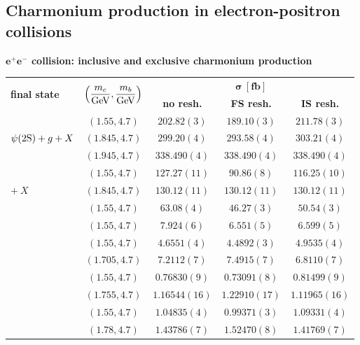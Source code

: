 \subsection{Charmonium production in electron-positron collisions}
\begin{table}[t!]
\centering
\renewcommand*{\arraystretch}{1.4}
\textbf{$\boldsymbol{e^+e^-}$ collision: inclusive and exclusive charmonium production}
\begin{tabular}[t]{lcccc}
\toprule
\multirow{2}{*}{\textbf{final state}}  & \multirow{2}{*}{$\left(\dfrac{m_c}{\rm GeV}, \dfrac{m_b}{\rm GeV}\right)$}& \multicolumn{3}{c}{$\boldsymbol{\sigma}~[\textbf{fb}]$} \\
& & \textbf{no resh.} & \textbf{FS resh.} & \textbf{IS resh.} \\
\midrule
\multirow{3}{*}{$\psi(2\mathrm{S}) + g + X$} 
& $(1.55,4.7)$ & $202.82 (3)$ & $189.10(3)$ & $211.78(3)$ \\ 
& $(1.845,4.7)$ & {$299.20(4)$} & {$293.58(4)$} & {$303.21(4)$} \\  
& $(1.945,4.7)$ & $338.490(4)$ & $338.490(4)$ & $338.490(4)$ \\ 
\hdashline
\multirow{1}{*}{$\psi(2\swave)\big[{}^3\swave_1^{[1]}\big] + gg$} 
& $(1.55,4.7)$ & $127.27(11)$ & $90.86(8)$ & $116.25(10)$ \\ 
{\qquad\qquad\quad$+\ X$}
& $(1.845,4.7)$ & {$130.12(11)$} & $130.12(11)$ & $130.12(11)$ \\ 
\hdashline
\multirow{1}{*}{$\psi(2\swave) + c \bar{c} + X$}
& $(1.55,4.7)$ & $63.08 (4)$ & $46.27 (3)$ & $50.54 (3)$ \\ 
\hdashline
\multirow{1}{*}{$h_c + c \bar{c} + X$} 
& $(1.55,4.7)$ & $7.924(6)$ & $6.551(5)$ & $6.599(5)$ \\ 
\hdashline
\multirow{2}{*}{$J/\psi + \chi_{c0}$} 
& $(1.55,4.7)$ & $4.6551(4)$ & $4.4892(3)$ & $4.9535(4)$ \\ 
& $(1.705,4.7)$ & $7.2112(7)$ & $7.4915(7)$ & $6.8110(7)$ \\ 
\hdashline
\multirow{2}{*}{$J/\psi + \chi_{c1}$} 
& $(1.55,4.7)$ & $0.76830(9)$ & $0.73091(8)$ & $0.81499(9)$ \\ 
& $(1.755,4.7)$ & $1.16544(16)$ & $1.22910(17)$ & $1.11965(16)$ \\ 
\hdashline
\multirow{2}{*}{$J/\psi + \chi_{c2}$} 
& $(1.55,4.7)$ & $1.04835(4)$ & $0.99371(3)$ & $1.09331(4)$ \\ 
& $(1.78,4.7)$ & $1.43786(7)$ & $1.52470(8)$ & $1.41769(7)$ \\ 

\end{tabular}
\end{table}
